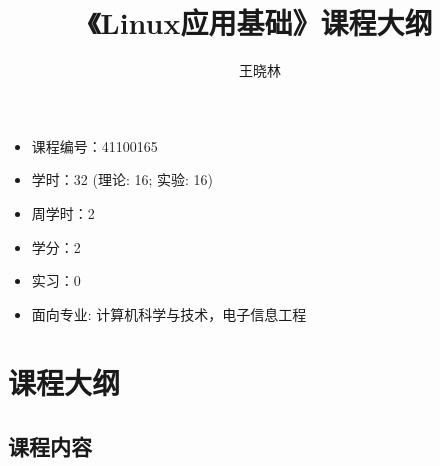 \documentclass{wx672ctexart}
\title{《Linux应用基础》课程大纲}
\author{王晓林}
\begin{document}
\maketitle
\tableofcontents

\begin{itemize}
\item 课程编号：41100165
\item 学时：32 (理论: 16; 实验: 16)
\item 周学时：2
\item 学分：2
\item 实习：0
\item 面向专业: 计算机科学与技术，电子信息工程
\end{itemize}

\section{课程大纲}

\subsection{课程内容}
\end{document}
